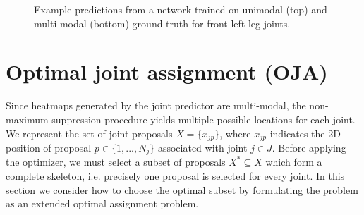 \begin{figure}[t]
\begin{floatrow}
{\begin{tabular}{c}
\end{tabular}
}{
\caption{Example predictions from a network trained on unimodal (top) and multi-modal (bottom) ground-truth  for front-left leg joints.}
\label{fig:single_multi}
}
\end{floatrow}
\end{figure}

\section{Optimal joint assignment (OJA)}\label{sec:qp}

Since heatmaps generated by the joint predictor are multi-modal, the non-maximum suppression procedure yields multiple possible locations for each joint. We represent the set of joint proposals $X = \{x_{jp}\}$, where $x_{jp}$ indicates the 2D position of proposal $p \in \{1,...,N_j\}$ associated with joint $j \in J$.
Before applying the optimizer, we must select a subset of proposals $X^* \subseteq X$ which form a complete skeleton, i.e. precisely one proposal is selected for every joint. In this section we consider how to choose the optimal subset by formulating the problem as an extended optimal assignment problem.

